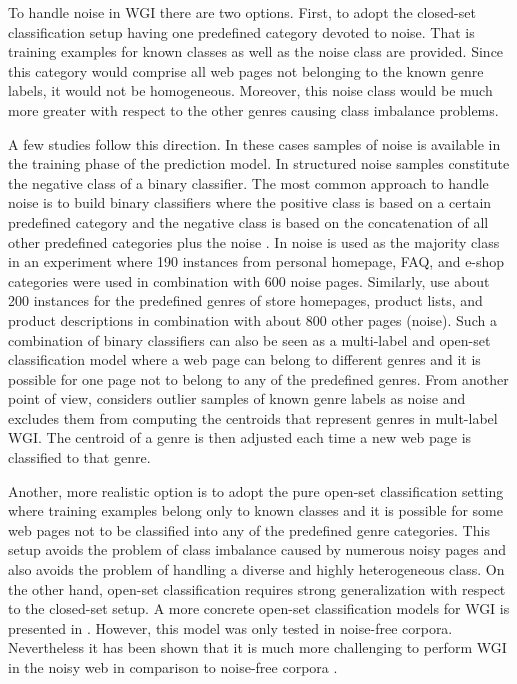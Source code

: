 To handle noise in WGI there are two options. First, to adopt the closed-set classification setup having one predefined category devoted to noise. That is training examples for known classes as well as the noise class are provided. Since this category would comprise all web pages not belonging to the known genre labels, it would not be homogeneous. Moreover, this noise class would be much more greater with respect to the other genres causing class imbalance problems. 

A few studies follow this direction. In these cases samples of noise is available in the training phase of the prediction model. In \parencite{Vidulin2007} structured noise samples constitute the negative class of a binary classifier. The most common approach to handle noise is to build binary classifiers where the positive class is based on a certain predefined category and the negative class is based on the concatenation of all other predefined categories plus the noise . In  noise is used as the majority class in an experiment where 190 instances from personal homepage, FAQ, and e-shop categories were used in combination with 600 noise pages. Similarly,  use about 200 instances for the predefined genres of store homepages, product lists, and product descriptions in combination with about 800 other pages (noise). Such a combination of binary classifiers can also be seen as a multi-label and open-set classification model where a web page can belong to different genres and it is possible for one page not to belong to any of the predefined genres. From another point of view,  considers outlier samples of known genre labels as noise and excludes them from computing the centroids that represent genres in mult-label WGI. The centroid of a genre is then adjusted each time a new web page is classified to that genre. 

Another, more realistic option is to adopt the pure open-set classification setting where training examples belong only to known classes and it is possible for some web pages not to be classified into any of the predefined genre categories. This setup avoids the problem of class imbalance caused by numerous noisy pages and also avoids the problem of handling a diverse and highly heterogeneous class. On the other hand, open-set classification requires strong generalization with respect to the closed-set setup. A more concrete open-set classification models for WGI is presented in \parencite{stubbe2007genre}. However, this model was only tested in noise-free corpora. Nevertheless it has been shown that it is much more challenging to perform WGI in the noisy web in comparison to noise-free corpora \parencite{Asheghi2015}.

